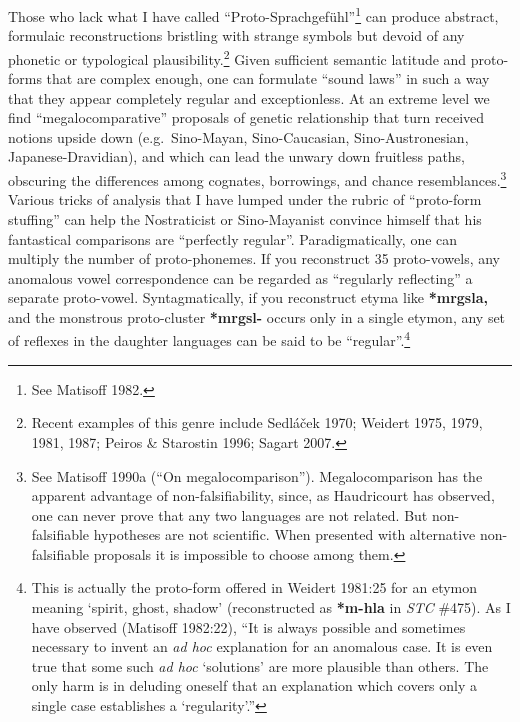 Those who lack what I have called “Proto-Sprachgefühl”\footnote{See
Matisoff 1982.} can produce abstract, formulaic reconstructions bristling with
strange symbols but devoid of any phonetic or typological
plausibility.\footnote{Recent examples of this genre include Sedláček
1970; Weidert 1975, 1979, 1981, 1987; Peiros \& Starostin 1996; Sagart 2007.} 
Given sufficient semantic latitude and proto-forms that are complex enough, one
can formulate “sound laws” in such a way that they appear completely regular and
exceptionless.  At an extreme level we find “megalocomparative” proposals of
genetic relationship that turn received notions upside down (e.g.\ Sino-Mayan,
Sino-Caucasian, Sino-Austronesian, Japanese-Dravidian), and which can lead the
unwary down fruitless paths, obscuring the differences among cognates,
borrowings, and chance resemblances.\footnote{See Matisoff 1990a (“On
megalocomparison”).  Megalocomparison has the apparent advantage of
non-falsifiability, since, as Haudricourt has observed, one can never prove that
any two languages are not related. But non-falsifiable hypotheses are not
scientific. When presented with alternative non-falsifiable proposals it is
impossible to choose among them.}  Various tricks of analysis that I have lumped
under the rubric of “proto-form stuffing” can help the Nostraticist or
Sino-Mayanist convince himself that his fantastical comparisons are “perfectly
regular”. Paradigmatically, one can multiply the number of proto-phonemes. If
you reconstruct 35 proto-vowels, any anomalous vowel correspondence can be
regarded as “regularly reflecting” a separate proto-vowel.  Syntagmatically, if
you reconstruct etyma like \textbf{*mrgsla,} and the monstrous proto-cluster
\textbf{*mrgsl-}
occurs only in a single etymon, any set of reflexes in the daughter languages
can be said to be “regular”.\footnote{This is actually the proto-form offered
in Weidert 1981:25 for an etymon meaning ‘spirit, ghost, shadow’ (reconstructed
as \textbf{*m-hla} in \textit{STC} \#475). As I have observed (Matisoff 1982:22), “It is always
possible and sometimes necessary to invent an \textit{ad hoc} explanation for an
anomalous case. It is even true that some such \textit{ad hoc} ‘solutions’ are more
plausible than others. The only harm is in deluding oneself that an explanation
which covers only a single case establishes a ‘regularity’.”}


